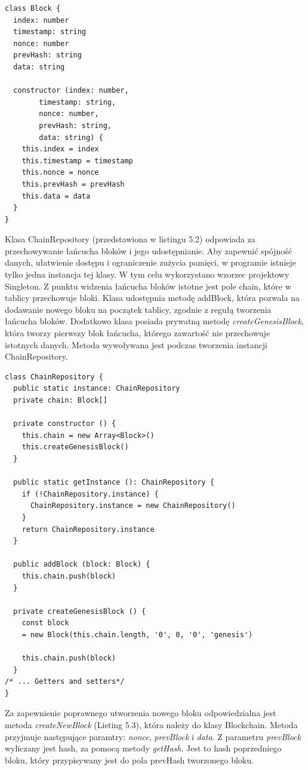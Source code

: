 \documentclass[a4paper,12pt]{book}
\begin{document}
\begin{lstlisting}[style=ES6, caption={Klasa Block.}]
class Block {
  index: number
  timestamp: string
  nonce: number
  prevHash: string
  data: string

  constructor (index: number,
 		timestamp: string,
 		nonce: number,
 		prevHash: string,
	 	data: string) {
    this.index = index
    this.timestamp = timestamp
    this.nonce = nonce
    this.prevHash = prevHash
    this.data = data
  }
}
\end{lstlisting}

Klasa ChainRepository (przedstawiona w listingu 5.2) odpowiada za przechowywanie łańcucha bloków i jego udostępnianie. Aby zapewnić spójność danych, ułatwienie dostępu i ograniczenie zużycia pamięci, w programie istnieje tylko jedna instancja tej klasy. W tym celu wykorzystano wzorzec projektowy Singleton. Z punktu widzenia łańcucha bloków istotne jest pole chain, które w tablicy przechowuje bloki. Klasa udostępnia metodę addBlock, która pozwala na dodawanie nowego bloku na początek tablicy, zgodnie z regułą tworzenia łańcucha bloków. Dodatkowo klasa posiada prywatną metodę \textit{createGenesisBlock}, która tworzy pierwszy blok łańcucha, którego zawartość nie przechowuje istotnych danych. Metoda wywoływana jest podczas tworzenia instancji ChainRepository.

\begin{lstlisting}[style=ES6, caption={Klasa ChainRepository.}]
class ChainRepository {
  public static instance: ChainRepository
  private chain: Block[]

  private constructor () {
    this.chain = new Array<Block>()
    this.createGenesisBlock()
  }

  public static getInstance (): ChainRepository {
    if (!ChainRepository.instance) {
      ChainRepository.instance = new ChainRepository()
    }
    return ChainRepository.instance
  }

  public addBlock (block: Block) {
    this.chain.push(block)
  }

  private createGenesisBlock () {
    const block 
	= new Block(this.chain.length, '0', 0, '0', 'genesis')

    this.chain.push(block)
  }
/* ... Getters and setters*/
}
\end{lstlisting}

Za zapewnienie poprawnego utworzenia nowego bloku odpowiedzialna jest metoda \textit{createNewBlock} (Listing 5.3), która należy do klasy Blockchain. Metoda przyjmuje następujące paramtry: \textit{nonce}, \textit{prevBlock} i \textit{data}. Z parametru \textit{prevBlock} wyliczany jest hash, za pomocą metody \textit{getHash}. Jest to hash poprzedniego bloku, który przypisywany jest do pola prevHash tworzonego bloku.
\end{document}
